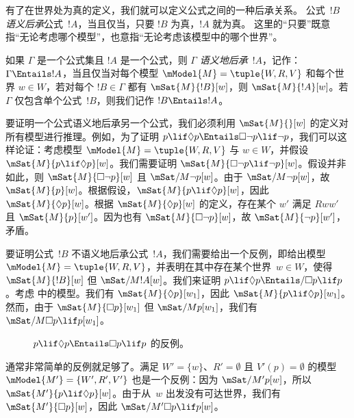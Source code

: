 \documentclass[../../../include/open-logic-section]{subfiles}
\begin{document}


\begin{explain}
  有了在世界处为真的定义，我们就可以定义公式之间的一种后承关系。
  公式~$!B$ \emph{语义后承}公式~$!A$，当且仅当，只要 $!B$ 为真，$!A$ 就为真。
  这里的“只要”既意指“无论考虑哪个模型”，也意指“无论考虑该模型中的哪个世界”。
\end{explain}

\begin{defn}
  如果 $\Gamma$ 是一个公式集且 $!A$ 是一个公式，则 $\Gamma$ \emph{语义地后承}~$!A$，记作：$\Gamma \Entails !A$，当且仅当对每个模型 $\mModel{M} = \tuple{W, R, V}$ 和每个世界 $w \in W$，若对每个 $!B \in \Gamma$ 都有 $\mSat{M}{!B}[w]$，则 $\mSat{M}{!A}[w]$。若 $\Gamma$ 仅包含单个公式~$!B$，则我们记作 $!B \Entails !A$。
\end{defn}

\begin{ex}
  要证明一个公式语义地后承另一个公式，我们必须利用 $\mSat{M}{}[w]$ 的定义对所有模型进行推理。例如，为了证明 $p \lif \Diamond p \Entails \Box\lnot p \lif \lnot p$，我们可以这样论证：考虑模型 $\mModel{M} = \tuple{W, R,
    V}$ 与 $w \in W$，并假设 $\mSat{M}{p \lif \Diamond
    p}[w]$。我们需要证明 $\mSat{M}{\Box\lnot p \lif \lnot
    p}[w]$。假设并非如此，则 $\mSat{M}{\Box\lnot p}[w]$ 且 $\mSat/{M}{\lnot p}[w]$。由于 $\mSat/{M}{\lnot p}[w]$，故 $\mSat{M}{p}[w]$。根据假设，$\mSat{M}{p \lif \Diamond p}[w]$，因此 $\mSat{M}{\Diamond p}[w]$。根据 $\mSat{M}{\Diamond
    p}[w]$ 的定义，存在某个 $w'$ 满足 $Rww'$ 且 $\mSat{M}{p}[w']$。因为也有 $\mSat{M}{\Box \lnot p}[w]$，故 $\mSat{M}{\lnot p}[w']$，矛盾。

  要证明公式~$!B$ 不语义地后承公式~$!A$，我们需要给出一个反例，即给出模型 $\mModel{M} = \tuple{W, R,
    V}$，并表明在其中存在某个世界~$w \in W$，使得 $\mSat{M}{!B}[w]$ 但 $\mSat/{M}{!A}[w]$。我们来证明 $p \lif \Diamond p \Entails/ \Box p \lif p$。考虑  中的模型。我们有 $\mSat{M}{\Diamond p}[w_1]$，因此 $\mSat{M}{p \lif
    \Diamond p}[w_1]$。然而，由于 $\mSat{M}{\Box p}[w_1]$ 但 $\mSat/{M}{p}[w_1]$，我们有 $\mSat/{M}{\Box p \lif p}[w_1]$。
  \begin{figure}
  \begin{center}
  \end{center}
  \caption{$p \lif \Diamond p \Entails \Box p \lif p$ 的反例。}
  \end{figure}

  通常非常简单的反例就足够了。满足 $W' = \{w\}$、$R' = \emptyset$ 且 $V'(p) = \emptyset$ 的模型 $\mModel{M'} =
  \{W', R', V'\}$ 也是一个反例：因为 $\mSat/{M'}{p}[w]$，所以 $\mSat{M'}{p \lif \Diamond p}[w]$。由于从~$w$ 出发没有可达世界，我们有 $\mSat{M'}{\Box p}[w]$，因此 $\mSat/{M'}{\Box p
    \lif p}[w]$。
\end{ex}
\end{document}
